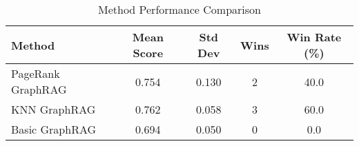 \begin{table}[h]
\centering
\begin{tabular}{|l|c|c|c|c|}
\hline
Method & Mean Score & Std Dev & Wins & Win Rate (\%) \\
\hline
PageRank GraphRAG & 0.754 & 0.130 & 2 & 40.0 \\
KNN GraphRAG & 0.762 & 0.058 & 3 & 60.0 \\
Basic GraphRAG & 0.694 & 0.050 & 0 & 0.0 \\
\hline
\end{tabular}
\caption{Method Performance Comparison}
\label{tab:method_comparison}
\end{table}
